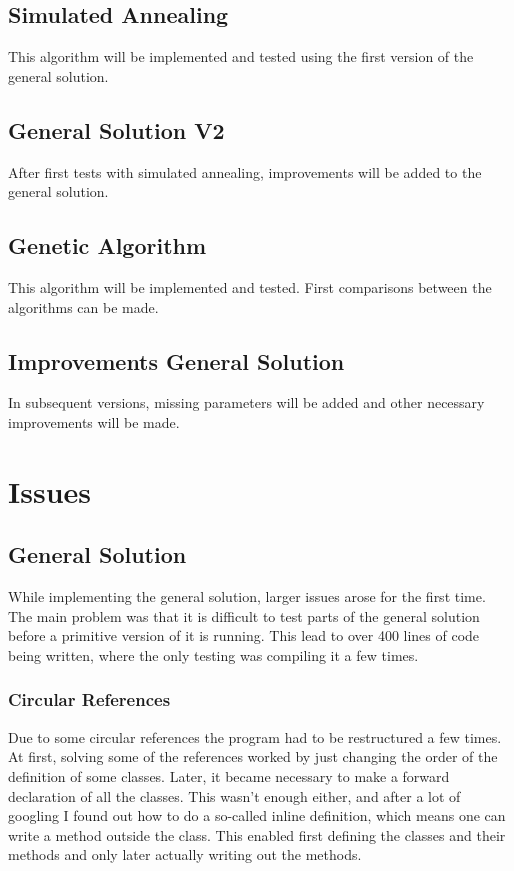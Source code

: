 \documentclass[10pt]{report}
\begin{document}
\section{Simulated Annealing}
This algorithm will be implemented and tested using the first version of the general solution.

\section{General Solution V2}
After first tests with simulated annealing, improvements will be added to the general solution.

\section{Genetic Algorithm}
This algorithm will be implemented and tested. First comparisons between the algorithms can be made.

\section{Improvements General Solution}
In subsequent versions, missing parameters will be added and other necessary improvements will be made.

\chapter{Issues}
\section{General Solution}
While implementing the general solution, larger issues arose for the first time. The main problem was that it is difficult to test parts of the general solution before a primitive version of it is running. This lead to over 400 lines of code being written, where the only testing was compiling it a few times. 

\subsection{Circular References}
Due to some circular references the program had to be restructured a few times. At first, solving some of the references worked by just changing the order of the definition of some classes. Later, it became necessary to make a forward declaration of all the classes. This wasn't enough either, and after a lot of googling I found out how to do a so-called inline definition, which means one can write a method outside the class. This enabled first defining the classes and their methods and only later actually writing out the methods.
\end{document}
